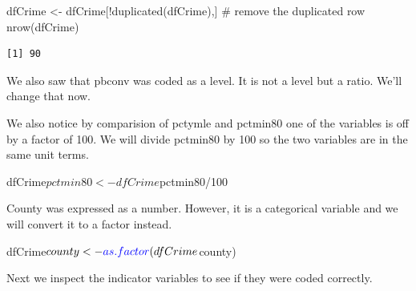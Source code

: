 \documentclass[]{article}
\newenvironment{Shaded}{}{}
\newcommand{\CommentTok}[1]{\textcolor[rgb]{0.00,0.50,0.00}{#1}}
\newcommand{\DecValTok}[1]{#1}
\newcommand{\KeywordTok}[1]{\textcolor[rgb]{0.00,0.00,1.00}{#1}}
\newcommand{\NormalTok}[1]{#1}
\newcommand{\OperatorTok}[1]{#1}
\newcommand{\StringTok}[1]{\textcolor[rgb]{0.00,0.50,0.50}{#1}}
\begin{document}
\begin{Shaded}
\begin{Highlighting}[]
\NormalTok{dfCrime <-}\StringTok{ }\NormalTok{dfCrime[}\OperatorTok{!}\KeywordTok{duplicated}\NormalTok{(dfCrime),] }\CommentTok{# remove the duplicated row}
\KeywordTok{nrow}\NormalTok{(dfCrime)}
\end{Highlighting}
\end{Shaded}

\begin{verbatim}
[1] 90
\end{verbatim}

We also saw that pbconv was coded as a level. It is not a level but a
ratio. We'll change that now.

\begin{Shaded}
\end{Shaded}

We also notice by comparision of pctymle and pctmin80 one of the
variables is off by a factor of 100. We will divide pctmin80 by 100 so
the two variables are in the same unit terms.

\begin{Shaded}
\begin{Highlighting}[]
\NormalTok{dfCrime}\OperatorTok{$}\NormalTok{pctmin80<-dfCrime}\OperatorTok{$}\NormalTok{pctmin80}\OperatorTok{/}\DecValTok{100}
\end{Highlighting}
\end{Shaded}

County was expressed as a number. However, it is a categorical variable
and we will convert it to a factor instead.

\begin{Shaded}
\begin{Highlighting}[]
\NormalTok{dfCrime}\OperatorTok{$}\NormalTok{county<-}\KeywordTok{as.factor}\NormalTok{(dfCrime}\OperatorTok{$}\NormalTok{county)}
\end{Highlighting}
\end{Shaded}

Next we inspect the indicator variables to see if they were coded
correctly.

\begin{Shaded}
\end{Shaded}
\end{document}
